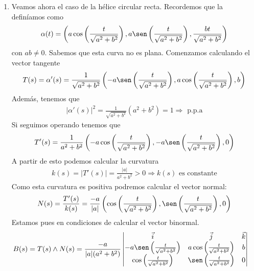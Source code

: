 \begin{ejercicio}
\begin{enumerate}
        \item Veamos ahora el caso de la hélice circular recta. Recordemos que la definíamos como 
        \begin{gather*}
            \alpha(t) = \left(a\cos\left(\frac{t}{\sqrt{a^2+ b^2}}\right), a\sen\left(\frac{t}{\sqrt{a^2+ b^2}}\right), \frac{bt}{\sqrt{a^2 + b^2}}\right)
        \end{gather*}
        con $ab\neq 0$. Sabemos que esta curva no es plana. Comenzamos calculando el vector tangente
        \begin{gather*}
            T(s) = \alpha'(s) = \frac{1}{\sqrt{a^2 + b^2}} \left(-a\sen\left(\frac{t}{\sqrt{a^2+ b^2}}\right), a\cos\left(\frac{t}{\sqrt{a^2+ b^2}}\right), b\right)
        \end{gather*}
        Además, tenemos que 
        \begin{gather*}
            |\alpha'(s)|^2 = \frac{1}{\sqrt{a^2 + b^2}} (a^2 + b^2) = 1 \Rightarrow \text{ p.p.a}
        \end{gather*}
        Si seguimos operando tenemos que 
        \begin{gather*}
            T'(s) = \frac{1}{a^2 + b^2} \left(-a\cos\left(\frac{t}{\sqrt{a^2+ b^2}}\right), -a\sen\left(\frac{t}{\sqrt{a^2+ b^2}}\right), 0\right)
        \end{gather*}
        A partir de esto podemos calcular la curvatura
        \begin{gather*}
            k(s) = |T'(s)| = \frac{|a|}{a^2 + b^2} > 0 \Rightarrow k(s)\text{ es constante}
        \end{gather*}
        Como esta curvatura es positiva podremos calcular el vector normal:
        \begin{gather*}
            N(s) = \frac{T'(s)}{k(s)} = \frac{-a}{|a|} \left(\cos\left(\frac{t}{\sqrt{a^2+ b^2}}\right), \sen\left(\frac{t}{\sqrt{a^2+ b^2}}\right), 0\right)
        \end{gather*}
        Estamos pues en condiciones de calcular el vector binormal.
        \begin{align*}
            B(s) &= T(s) \wedge N(s) = 
            \frac{-a}{|a|(a^2 + b^2)} \begin{vmatrix}
                \vec{i} & \vec{j} & \vec{k}\\
                -a\sen\left(\frac{t}{\sqrt{a^2+ b^2}}\right) & a\cos\left(\frac{t}{\sqrt{a^2+ b^2}}\right) & b\\
                \cos\left(\frac{t}{\sqrt{a^2+ b^2}}\right) & \sen\left(\frac{t}{\sqrt{a^2+ b^2}}\right) & 0

\end{vmatrix}
\end{align*}
\end{enumerate}
\end{ejercicio}

